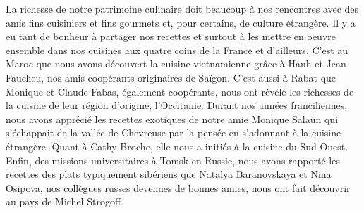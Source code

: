 La richesse de notre patrimoine culinaire doit beaucoup à nos rencontres avec des amis fins cuisiniers et fins gourmets et, pour certains, de culture étrangère. Il y a eu tant de bonheur à partager nos recettes et surtout à les mettre en oeuvre ensemble dans nos cuisines aux quatre coins de la France et d'ailleurs. C'est au Maroc que nous avons découvert la cuisine vietnamienne grâce à Hanh et Jean Faucheu, nos amis coopérants originaires de Saïgon. C'est aussi à Rabat que Monique et Claude Fabas, également coopérants, nous ont révélé les richesses de la cuisine de leur région d'origine, l'Occitanie. Durant nos années franciliennes, nous avons apprécié les recettes exotiques de notre amie Monique Salaün qui s'échappait de la vallée de Chevreuse par la pensée en s'adonnant à la cuisine étrangère. Quant à Cathy Broche, elle nous a initiés à la cuisine du Sud-Ouest. Enfin, des missions universitaires à Tomsk en Russie, nous avons rapporté les recettes des plats typiquement sibériens que Natalya Baranovskaya et Nina Osipova, nos collègues russes devenues de bonnes amies, nous ont fait découvrir au pays de Michel Strogoff.   